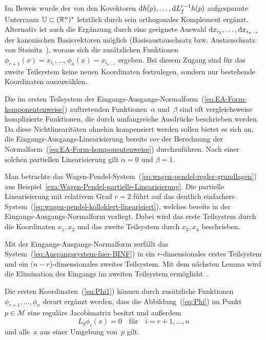 \begin{remark}
Im Beweis wurde der von den Kovektoren ${\mathrm{d}} h(p),\ldots,{\mathrm{d}} L_{f}^{r-1}h(p)$
aufgespannte Unterraum $\mathbb{U}\subset({\mathbb{R}}^{n})^{*}$ letztlich
durch sein orthogonales Komplement ergänzt. Alternativ ist auch die
Ergänzung durch eine geeignete Auswahl ${\mathrm{d}} x_{i_{1}},\ldots,{\mathrm{d}} x_{i_{n-r}}$
der kanonischen Basisvektoren möglich (Basis\-aus\-tausch\-satz
bzw. Aus\-tausch\-satz von Steinitz~\cite{kerner2007}), woraus
sich die zusätzlichen Funktionen $\phi_{r+1}(x)=x_{i_{1}},\ldots,\phi_{n}(x)=x_{i_{n-r}}$
ergeben. Bei diesem Zugang sind für das zweite Teilsystem keine neuen
Koordinaten festzulegen, sondern nur bestehende Koordinaten auszuwählen.
\end{remark}

Die im ersten Teilsystem der Eingangs-Ausgangs-Normalform~(\ref{eq:EA-Form-komponentenweise})
auftretenden Funktionen~$\alpha$ und~$\beta$ sind oft vergleichsweise
komplizierte Funktionen, die durch umfangreiche Ausdrücke beschrieben
werden. Da diese Nichtlinearitäten ohnehin kompensiert werden sollen
bietet es sich an, die Eingangs-Ausgangs-Linearisierung bereits \textit{vor}
der Berechnung der Normalform~(\ref{eq:EA-Form-komponentenweise})
durchzuführen. Nach einer solchen partiellen Linearisierung gilt $\alpha=0$
und $\beta=1$. 

\begin{example}
\label{exa:Wagen-Pendel-EA-NF}Man betrachte das Wagen-Pendel-System~(\ref{eq:wagen-pendel-regler-grundlagen})
aus Beispiel~\ref{exa:Wagen-Pendel-partielle-Linearisierung}. Die
partielle Linearisierung mit relativem Grad $r=2$ führt auf das deutlich
einfachere System~(\ref{eq:wagen-pendel-kollokiert-linearisiert}),
welches bereits in der Eingangs-Ausgangs-Normalform vorliegt. Dabei
wird das erste Teilsystem durch die Koordinaten $x_{1},x_{2}$ und
das zweite Teilsystem durch $x_{3},x_{4}$ beschrieben.
\end{example}

Mit der Eingangs-Ausgangs-Normalform zerfällt das System~(\ref{eq:Ausgangssystem-fuer-BINF})
in ein $r$-dimensionales erstes Teilsystem und ein $(n-r$)-dimensionales
zweites Teilsystem. Mit dem nächsten Lemma wird die Elimination des
Eingangs im zweiten Teilsystem ermöglicht~\cite[Prop.~{4.1.3}]{isidori3}.
\begin{lemma}
\label{lem:LgNull}Die ersten Koordinaten~(\ref{eq:Phi1}) können
durch zusätzliche Funktionen $\phi_{r+1},\ldots,\phi_{n}$ derart
ergänzt werden, dass die Abbildung~(\ref{eq:Phi}) im Punkt $p\in\mathcal{M}$
eine reguläre Jacobi\-matrix besitzt und außerdem 
\begin{equation}
L_{g}\phi_{i}(x)=0\quad\mbox{für}\quad i=r+1,\ldots,n\label{eq:Lg-phi}
\end{equation}
und alle~$x$ aus einer Umgebung von~$p$ gilt.
\end{lemma}

